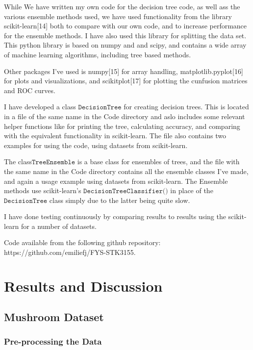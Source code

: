 \documentclass[11pt]{article}
\begin{document}
While We have written my own code for the decision tree code, as well ass the various ensemble methods used, we have used functionality from the library scikit-learn[14] both to compare with our own code, and to increase performance for the ensemble methods. I have also used this library for splitting the data set. This python library is based on
numpy and and scipy, and contains a wide array of machine learning algorithms, including tree based methods.

Other packages I've used is numpy{[}15{]} for array handling,
matplotlib.pyplot{[}16{]} for plots and visualizations, and scikitplot[17] for plotting the cunfusion matrices and ROC curves.

I have developed a class \(\texttt{DecisionTree}\) for creating decision trees. This is located in a file of the same name in the Code directory and aslo includes some relevant helper functions like for printing the tree, calculating accuracy, and comparing with the equivalent functionality in scikit-learn. The file also contains two examples for using the code, using datasets from scikit-learn.

The class\(\texttt{TreeEnsemble}\) is a base class for ensembles of trees, and the file with the same name in the Code directory contains all the ensemble classes I've made, and again a usage example using datasets from scikit-learn. The Ensemble methods use scikit-learn's \(\texttt{DecisionTreeClassifier()}\) in place of the \(\texttt{DecisionTree}\) class simply due to the latter being quite slow.

I have done testing continuously by comparing results to results using the scikit-learn for a number of datasets.

Code available from the following github repository:
https://github.com/emiliefj/FYS-STK3155.

\hypertarget{results-and-discussion}{%
\section{Results and Discussion}\label{results-and-discussion}}


\hypertarget{mushroom-dataset}{%
	\subsection{Mushroom Dataset}\label{mushroom-dataset}}

    \hypertarget{pre-processing-the-data}{%
\subsubsection{Pre-processing the Data}\label{pre-processing-the-data}}
\end{document}

